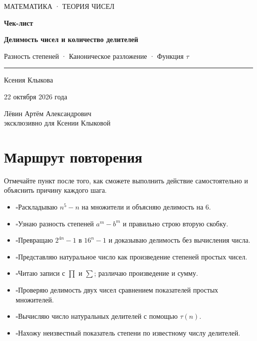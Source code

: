 \documentclass[a4paper,12pt]{article}
\newcommand{\checkitem}{\(\square\)\enspace}
\newcommand{\sectiontitle}[1]{\needspace{5\baselineskip}\section*{\color{deepaccent}#1}}
\begin{document}
\thispagestyle{empty}
\begin{center}
\vspace*{27mm}
{\color{accent}\large МАТЕМАТИКА · ТЕОРИЯ ЧИСЕЛ}\par
\vspace{20mm}
{\Huge\bfseries Чек-лист}\par
\vspace{9mm}
{\LARGE\color{deepaccent}\bfseries Делимость чисел и количество делителей}\par
\vspace{6mm}
{\large Разность степеней · Каноническое разложение · Функция $\tau$}\par
\vspace{17mm}
\rule{0.68\textwidth}{0.5pt}\par
\vspace{10mm}
{\Large Ксения Клыкова}\par
\vspace{4mm}
{\large 22 октября 2026 года}\par
\vfill
{\normalsize\color{textgray} Лёвин Артём Александрович\\[3pt]
эксклюзивно для Ксении Клыковой}\par
\vspace{12mm}
\vspace*{7mm}
\end{center}
\clearpage

\sectiontitle{Маршрут повторения}
Отмечайте пункт после того, как сможете выполнить действие самостоятельно и объяснить причину каждого шага.
\begin{itemize}[label={}]
\item \checkitem Раскладываю $n^5-n$ на множители и объясняю делимость на $6$.
\item \checkitem Узнаю разность степеней $a^m-b^m$ и правильно строю вторую скобку.
\item \checkitem Превращаю $2^{4n}-1$ в $16^n-1$ и доказываю делимость без вычисления числа.
\item \checkitem Представляю натуральное число как произведение степеней простых чисел.
\item \checkitem Читаю записи с $\prod$ и $\sum$; различаю произведение и сумму.
\item \checkitem Проверяю делимость двух чисел сравнением показателей простых множителей.
\item \checkitem Вычисляю число натуральных делителей с помощью $\tau(n)$.
\item \checkitem Нахожу неизвестный показатель степени по известному числу делителей.
\end{itemize}
\end{document}
